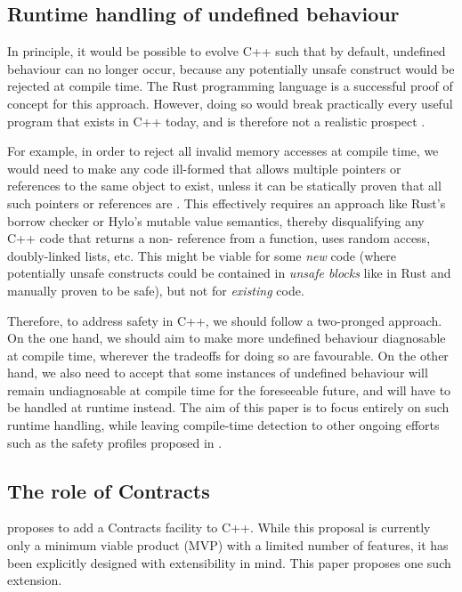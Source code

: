 \subsection{Runtime handling of undefined behaviour}

In principle, it would be possible to evolve C++ such that by default, undefined behaviour can no longer occur, because any  potentially unsafe construct would be rejected at compile time. The Rust programming language is a successful proof of concept for this approach. However, doing so would break practically every useful program that exists in C++ today, and is therefore not a realistic prospect \cite{Doumler2023}.

For example, in order to reject all invalid memory accesses at compile time, we would need to make any code ill-formed that allows multiple pointers or references to the same object to exist, unless it can be statically proven that all such pointers or references are . This effectively requires an approach like Rust's borrow checker or Hylo's mutable value semantics, thereby disqualifying any C++ code that returns a non- reference from a function, uses random access, doubly-linked lists, etc. This might be viable for some \emph{new} code (where potentially unsafe constructs could be contained in \emph{unsafe blocks} like in Rust and manually proven to be safe), but not for \emph{existing} code. 

Therefore, to address safety in C++, we should follow a two-pronged approach. On the one hand, we should aim to make more undefined behaviour diagnosable at compile time, wherever the tradeoffs for doing so are favourable. On the other hand, we also need to accept that some instances of undefined behaviour will remain undiagnosable at compile time for the foreseeable future, and will have to be handled at runtime instead. The aim of this paper is to focus entirely on such runtime handling, while leaving compile-time detection to other ongoing efforts such as the safety profiles proposed in \cite{P2687R0}.

\subsection{The role of Contracts}

\cite{P2900R6} proposes to add a Contracts facility to C++. While this proposal is currently only a minimum viable product (MVP) with a limited number of features, it has been explicitly designed with extensibility in mind. This paper proposes one such extension.

